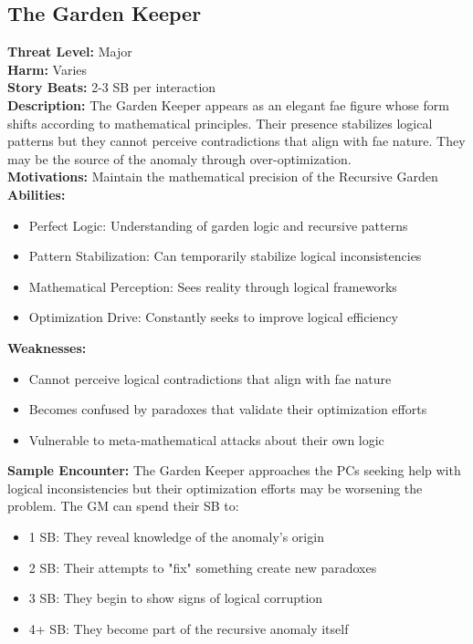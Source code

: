 \documentclass[11pt]{article}
\newenvironment{monsterentry}[1]{%
  \begin{mdframed}[backgroundcolor=shadecolor, linewidth=0pt, leftmargin=0pt, rightmargin=0pt]%
  \subsection*{#1}%
}{%
  \end{mdframed}%
}
\begin{document}
\begin{monsterentry}{The Garden Keeper}
\textbf{Threat Level:} Major \\
\textbf{Harm:} Varies \\
\textbf{Story Beats:} 2-3 SB per interaction \\
\textbf{Description:} The Garden Keeper appears as an elegant fae figure whose form shifts according to mathematical principles. Their presence stabilizes logical patterns but they cannot perceive contradictions that align with fae nature. They may be the source of the anomaly through over-optimization. \\
\textbf{Motivations:} Maintain the mathematical precision of the Recursive Garden \\
\textbf{Abilities:}
\begin{itemize}
    \item Perfect Logic: Understanding of garden logic and recursive patterns
    \item Pattern Stabilization: Can temporarily stabilize logical inconsistencies
    \item Mathematical Perception: Sees reality through logical frameworks
    \item Optimization Drive: Constantly seeks to improve logical efficiency
\end{itemize}
\textbf{Weaknesses:}
\begin{itemize}
\item Cannot perceive logical contradictions that align with fae nature
\item Becomes confused by paradoxes that validate their optimization efforts
\item Vulnerable to meta-mathematical attacks about their own logic
\end{itemize}
\textbf{Sample Encounter:} The Garden Keeper approaches the PCs seeking help with logical inconsistencies but their optimization efforts may be worsening the problem. The GM can spend their SB to:
\begin{itemize}
\item 1 SB: They reveal knowledge of the anomaly's origin
\item 2 SB: Their attempts to "fix" something create new paradoxes
\item 3 SB: They begin to show signs of logical corruption
\item 4+ SB: They become part of the recursive anomaly itself
\end{itemize}
\end{monsterentry}
\end{document}
